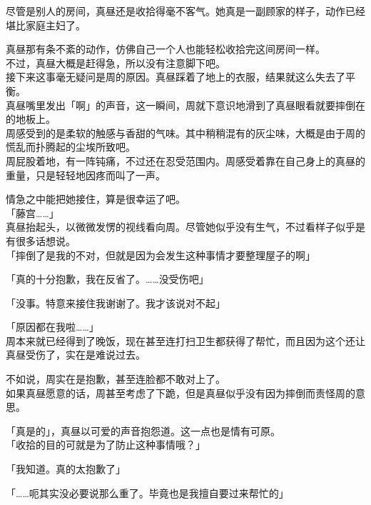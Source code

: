 尽管是别人的房间，真昼还是收拾得毫不客气。她真是一副顾家的样子，动作已经堪比家庭主妇了。

真昼那有条不紊的动作，仿佛自己一个人也能轻松收拾完这间房间一样。\\

不过，真昼大概是赶得急，所以没有注意脚下吧。\\

接下来这事毫无疑问是周的原因。真昼踩着了地上的衣服，结果就这么失去了平衡。\\

真昼嘴里发出「啊」的声音，这一瞬间，周就下意识地滑到了真昼眼看就要摔倒在的地板上。\\

周感受到的是柔软的触感与香甜的气味。其中稍稍混有的灰尘味，大概是由于周的慌乱而扑腾起的尘埃所致吧。\\

周屁股着地，有一阵钝痛，不过还在忍受范围内。周感受着靠在自己身上的真昼的重量，只是轻轻地因疼而叫了一声。

情急之中能把她接住，算是很幸运了吧。\\

「藤宫……」\\

真昼抬起头，以微微发愣的视线看向周。尽管她似乎没有生气，不过看样子似乎是有很多话想说。\\

「摔倒了是我的不对，但就是因为会发生这种事情才要整理屋子的啊」

「真的十分抱歉，我在反省了。……没受伤吧」

「没事。特意来接住我谢谢了。我才该说对不起」

「原因都在我啦……」\\

周本来就已经得到了晚饭，现在甚至连打扫卫生都获得了帮忙，而且因为这个还让真昼受伤了，实在是难说过去。

不如说，周实在是抱歉，甚至连脸都不敢对上了。\\

如果真昼愿意的话，周甚至考虑了下跪，但是真昼似乎没有因为摔倒而责怪周的意思。

「真是的」，真昼以可爱的声音抱怨道。这一点也是情有可原。\\

「收拾的目的可就是为了防止这种事情哦？」

「我知道。真的太抱歉了」

「……呃其实没必要说那么重了。毕竟也是我擅自要过来帮忙的」\\

